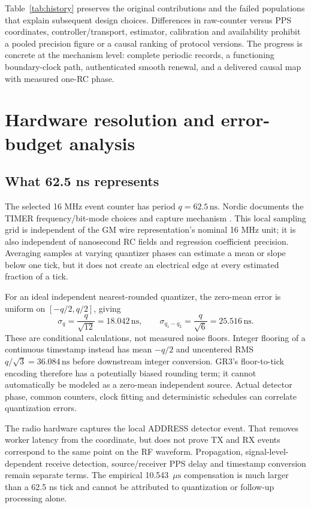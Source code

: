 \documentclass[11pt,letterpaper]{article}
\newcommand{\ns}{\,\mathrm{ns}}\newcommand{\us}{\,\mu\mathrm{s}}\newcommand{\ms}{\,\mathrm{ms}}\newcommand{\ppb}{\,\mathrm{ppb}}\newcommand{\code}[1]{\texttt{#1}}\newcolumntype{L}[1]{>{\RaggedRight\arraybackslash}p{#1}}
\begin{document}
Table~\ref{tab:history} preserves the original contributions and the failed populations that explain subsequent design choices. Differences in raw-counter versus PPS coordinates, controller/transport, estimator, calibration and availability prohibit a pooled precision figure or a causal ranking of protocol versions. The progress is concrete at the mechanism level: complete periodic records, a functioning boundary-clock path, authenticated smooth renewal, and a delivered causal map with measured one-RC phase.

\section{Hardware resolution and error-budget analysis}\label{sec:hardware}
\subsection{What 62.5 ns represents}
The selected 16 MHz event counter has period $q=62.5\ns$. Nordic documents the TIMER frequency/bit-mode choices and capture mechanism \cite{timer}. This local sampling grid is independent of the GM wire representation's nominal 16 MHz unit; it is also independent of nanosecond RC fields and regression coefficient precision. Averaging samples at varying quantizer phases can estimate a mean or slope below one tick, but it does not create an electrical edge at every estimated fraction of a tick.

For an ideal independent nearest-rounded quantizer, the zero-mean error is uniform on $[-q/2,q/2]$, giving
\begin{equation}
 \sigma_q=\frac{q}{\sqrt{12}}=18.042\ns,\qquad
 \sigma_{q_1-q_2}=\frac{q}{\sqrt6}=25.516\ns .\label{eq:quant}
\end{equation}
These are conditional calculations, not measured noise floors. Integer flooring of a continuous timestamp instead has mean $-q/2$ and uncentered RMS $q/\sqrt3=36.084\ns$ before downstream integer conversion. GR3's floor-to-tick encoding therefore has a potentially biased rounding term; it cannot automatically be modeled as a zero-mean independent source. Actual detector phase, common counters, clock fitting and deterministic schedules can correlate quantization errors.

The radio hardware captures the local ADDRESS detector event. That removes worker latency from the coordinate, but does not prove TX and RX events correspond to the same point on the RF waveform. Propagation, signal-level-dependent receive detection, source/receiver PPS delay and timestamp conversion remain separate terms. The empirical 10.543 $\us$ compensation is much larger than a 62.5 ns tick and cannot be attributed to quantization or follow-up processing alone.
\end{document}

